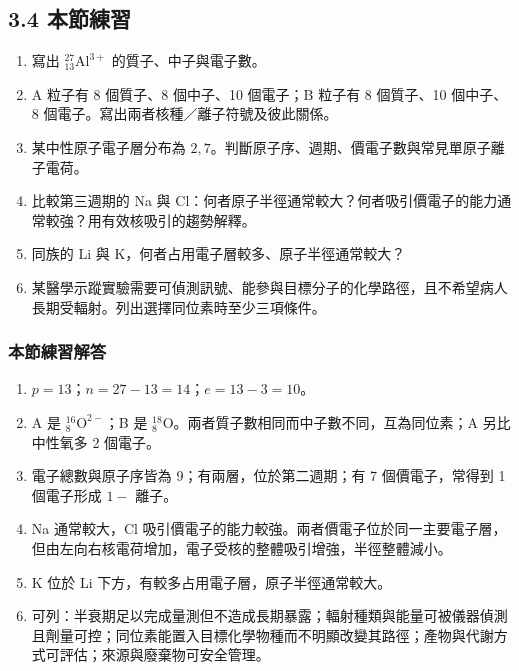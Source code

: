 \documentclass[11pt,a4paper]{article}
\providecommand{\tightlist}{%
  \setlength{\itemsep}{0pt}\setlength{\parskip}{0pt}}
\begin{document}
\subsection{3.4 本節練習}\label{ux672cux7bc0ux7df4ux7fd2-2}

\begin{enumerate}
\def\labelenumi{\arabic{enumi}.}
\tightlist
\item
  寫出 \({}^{27}_{13}\mathrm{Al}^{3+}\) 的質子、中子與電子數。
\item
  A 粒子有 8 個質子、8 個中子、10 個電子；B 粒子有 8 個質子、10 個中子、8 個電子。寫出兩者核種／離子符號及彼此關係。
\item
  某中性原子電子層分布為 \(2,7\)。判斷原子序、週期、價電子數與常見單原子離子電荷。
\item
  比較第三週期的 Na 與 Cl：何者原子半徑通常較大？何者吸引價電子的能力通常較強？用有效核吸引的趨勢解釋。
\item
  同族的 Li 與 K，何者占用電子層較多、原子半徑通常較大？
\item
  某醫學示蹤實驗需要可偵測訊號、能參與目標分子的化學路徑，且不希望病人長期受輻射。列出選擇同位素時至少三項條件。
\end{enumerate}

\subsubsection{本節練習解答}\label{ux672cux7bc0ux7df4ux7fd2ux89e3ux7b54-2}

\begin{enumerate}
\def\labelenumi{\arabic{enumi}.}
\tightlist
\item
  \(p=13\)；\(n=27-13=14\)；\(e=13-3=10\)。
\item
  A 是 \({}^{16}_{8}\mathrm O^{2-}\)；B 是 \({}^{18}_{8}\mathrm O\)。兩者質子數相同而中子數不同，互為同位素；A 另比中性氧多 2 個電子。
\item
  電子總數與原子序皆為 9；有兩層，位於第二週期；有 7 個價電子，常得到 1 個電子形成 \(1-\) 離子。
\item
  Na 通常較大，Cl 吸引價電子的能力較強。兩者價電子位於同一主要電子層，但由左向右核電荷增加，電子受核的整體吸引增強，半徑整體減小。
\item
  K 位於 Li 下方，有較多占用電子層，原子半徑通常較大。
\item
  可列：半衰期足以完成量測但不造成長期暴露；輻射種類與能量可被儀器偵測且劑量可控；同位素能置入目標化學物種而不明顯改變其路徑；產物與代謝方式可評估；來源與廢棄物可安全管理。
\end{enumerate}
\end{document}
